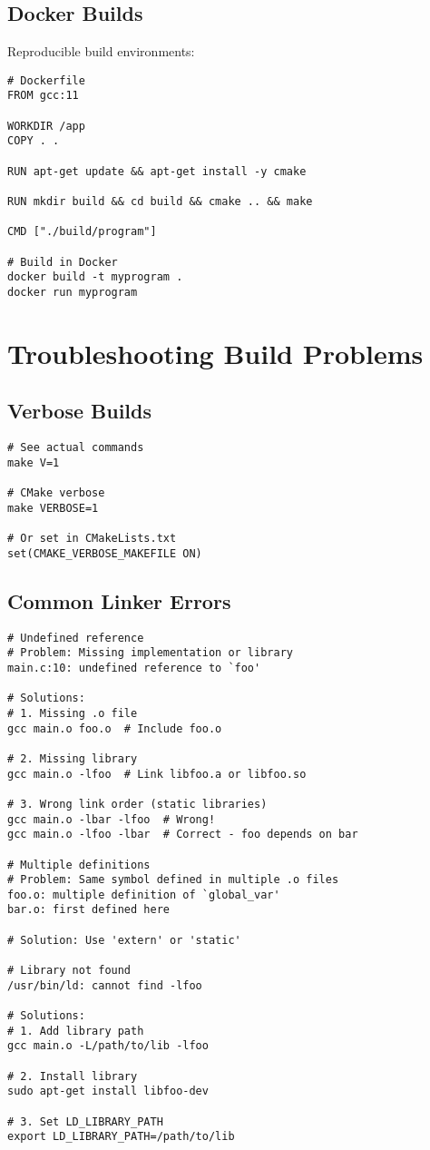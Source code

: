 \subsection{Docker Builds}

Reproducible build environments:

\begin{lstlisting}
# Dockerfile
FROM gcc:11

WORKDIR /app
COPY . .

RUN apt-get update && apt-get install -y cmake

RUN mkdir build && cd build && cmake .. && make

CMD ["./build/program"]

# Build in Docker
docker build -t myprogram .
docker run myprogram
\end{lstlisting}

\section{Troubleshooting Build Problems}

\subsection{Verbose Builds}

\begin{lstlisting}
# See actual commands
make V=1

# CMake verbose
make VERBOSE=1

# Or set in CMakeLists.txt
set(CMAKE_VERBOSE_MAKEFILE ON)
\end{lstlisting}

\subsection{Common Linker Errors}

\begin{lstlisting}
# Undefined reference
# Problem: Missing implementation or library
main.c:10: undefined reference to `foo'

# Solutions:
# 1. Missing .o file
gcc main.o foo.o  # Include foo.o

# 2. Missing library
gcc main.o -lfoo  # Link libfoo.a or libfoo.so

# 3. Wrong link order (static libraries)
gcc main.o -lbar -lfoo  # Wrong!
gcc main.o -lfoo -lbar  # Correct - foo depends on bar

# Multiple definitions
# Problem: Same symbol defined in multiple .o files
foo.o: multiple definition of `global_var'
bar.o: first defined here

# Solution: Use 'extern' or 'static'

# Library not found
/usr/bin/ld: cannot find -lfoo

# Solutions:
# 1. Add library path
gcc main.o -L/path/to/lib -lfoo

# 2. Install library
sudo apt-get install libfoo-dev

# 3. Set LD_LIBRARY_PATH
export LD_LIBRARY_PATH=/path/to/lib
\end{lstlisting}

